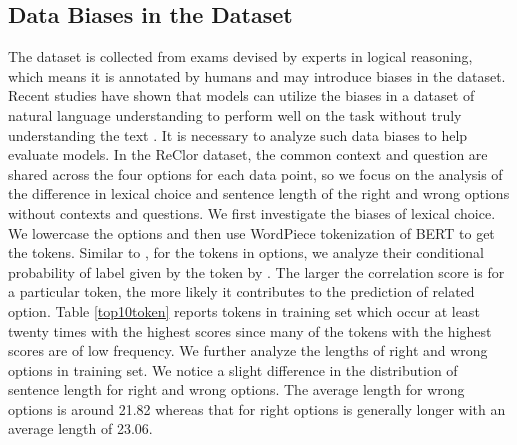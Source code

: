 \documentclass{article} \usepackage{iclr2020_conference,times}
\newcommand\bertbase{BERT\xspace}
\begin{document}
\subsection{Data Biases in the Dataset}
	
The dataset is collected from exams devised by experts in logical reasoning, which means it is annotated by humans and may introduce biases in the dataset. Recent studies have shown that models can utilize the biases in a dataset of natural language understanding to perform well on the task without truly understanding the text \citep{schwartz2017story, cai2017pay, bugert2017lsdsem, poliak2018hypothesis, gururangan2018annotation, zellers2019hellaswag}. It is necessary to analyze such data biases to help evaluate models. In the ReClor dataset, the common context and question are shared across the four options for each data point, so we focus on the analysis of the difference in lexical choice and sentence length of the right and wrong options without contexts and questions.
We first investigate the biases of lexical choice. We lowercase the options and then use WordPiece tokenization \citep{wu2016google} of \bertbase \citep{devlin2019bert} to get the tokens.
Similar to \citet{poliak2018hypothesis}, for the tokens in options, we analyze their conditional probability of label  given by the token  by . The larger the correlation score is for a particular token, the more likely it contributes to the prediction of related option. Table \ref{top10token} reports tokens in training set which occur at least twenty times with the highest scores since many of the tokens with the highest scores are of low frequency. We further analyze the lengths of right and wrong options \citep{gururangan2018annotation} in training set. 
We notice a slight difference in the distribution of sentence length for right and wrong options. The average length for wrong options is around 21.82 whereas that for right options is generally longer with an average length of 23.06. 
	
\end{document}
